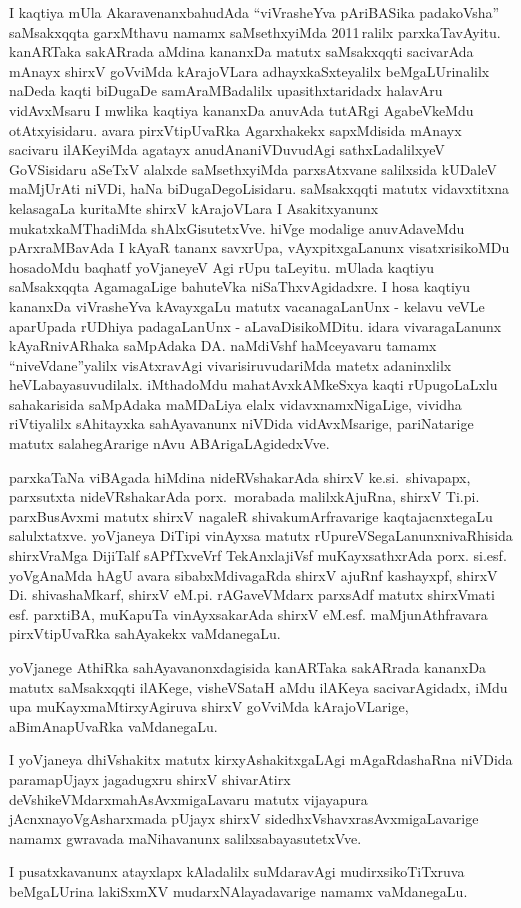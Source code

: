 I kaqtiya mUla AkaravenanxbahudAda ``viVrasheYva pAriBASika padakoVsha'' saMsakxqqta garxMthavu namamx saMsethxyiMda 2011\,ralilx parxkaTavAyitu. kanARTaka sakARrada aMdina kananxDa matutx saMsakxqqti sacivarAda mAnayx shirxV goVviMda kArajoVLara adhayxkaSxte\-yalilx beMgaLUrinalilx naDeda kaqti biDugaDe samAraMBadalilx upasithxtaridadx halavAru vidAvxMsaru I mwlika kaqtiya kananxDa anuvAda \hbox{tutARgi} AgabeVkeMdu otAtxyisidaru. avara pirxVtipUvaRka Agarxhakekx sapxMdisida mAnayx sacivaru ilAKeyiMda agatayx anudAna\break niVDuvudAgi sathxLadalilxyeV GoVSisidaru aSeTxV alalxde saMsethxyiMda parxsAtxvane salilxsida kUDaleV maMjUrAti niVDi, haNa biDugaDegoLisidaru. saMsakxqqti matutx vidavxtitxna kelasagaLa kuritaMte shirxV kArajoVLara I Asakitxyanunx mukatxkaMThadiMda shAlxGisutetxVve. hiVge modalige anuvAdaveMdu pArxraMBavAda I kAyaR tananx savxrUpa, vAyxpitxgaLanunx visatxrisikoMDu hosadoMdu baqhatf \hbox{yoVjaneyeV} Agi rUpu taLeyitu. mUlada kaqtiyu saMsakxqqta AgamagaLige bahuteVka niSaThxvAgidadxre. I hosa kaqtiyu kananxDa viVrasheYva kAvayxgaLu matutx vacanagaLanUnx - kelavu veVLe aparUpada rUDhiya padagaLanUnx - aLavaDisikoMDitu. idara vivara\-gaLanunx kAyaR\-nivARhaka saMpAdaka DA. naMdiVshf haMceyavaru tamamx ``niveVdane''yalilx visAtxravAgi vivarisiruvudariMda matetx adaninxlilx heVLabayasuvudilalx. iMthadoMdu mahatAvxkAMkeSxya kaqti rUpugoLaLxlu sahakarisida saMpAdaka maMDaLiya elalx vidavxnamxNigaLige, vividha riVtiyalilx sAhitayxka sahAyavanunx niVDida vidAvxMsarige, pariNatarige matutx salahegArarige nAvu ABArigaLAgidedxVve.

\medskip

parxkaTaNa viBAgada hiMdina nideRVshakarAda shirxV ke.si.~shivapapx, parxsutxta nideVRshakarAda porx.~morabada malilxkAjuRna, shirxV Ti.pi. parxBusAvxmi matutx shirxV nagaleR shivakumArfravarige kaqtajacnxtegaLu salulxtatxve. yoVjaneya DiTipi vinAyxsa matutx rUpureVSegaLanunx\break nivaRhisida shirxVraMga DijiTalf sAPfTxveVrf TekAnxlajiVsf muKayxsathxrAda porx. si.esf. \hbox{yoVgAnaMda} hAgU avara sibabxMdivagaRda shirxV ajuRnf kashayxpf, shirxV Di. shivashaMkarf, shirxV eM.pi. rAGaveVMdarx parxsAdf matutx shirxVmati esf. parxtiBA, muKapuTa vinAyxsakarAda shirxV eM.esf. maMjunAthfravara pirxVtipUvaRka sahAyakekx vaMdanegaLu.

\medskip

yoVjanege AthiRka sahAyavanonxdagisida kanARTaka sakARrada kananxDa matutx saMsakxqqti ilAKege, visheVSataH aMdu ilAKeya sacivarAgidadx, iMdu upa muKayxmaMtirxyAgiruva shirxV goVviMda kArajoVLarige, aBimAnapUvaRka vaMdanegaLu.

\medskip

I yoVjaneya dhiVshakitx matutx kirxyAshakitxgaLAgi mAgaRdashaRna niVDida paramapUjayx jagadugxru shirxV shivarAtirx deVshikeVMdarx\break mahAsAvxmigaLavaru matutx vijayapura jAcnxnayoVgAsharxmada pUjayx shirxV sidedhxVshavxrasAvxmigaLavarige namamx gwravada maNihavanunx salilxsa\-bayasutetxVve.

\medskip

I pusatxkavanunx atayxlapx kAladalilx suMdaravAgi mudirxsikoTiTxruva beMgaLUrina lakiSxmXV mudarxNAlayadavarige namamx vaMdanegaLu.

